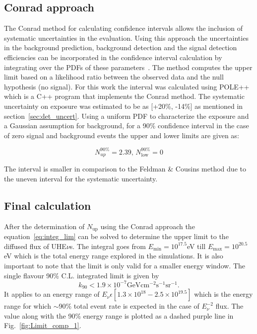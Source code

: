 \subsection{Conrad approach}
\label{subsec:Conrad}
The Conrad method for calculating confidence intervals allows the inclusion of systematic uncertainties in the evaluation. Using this approach the uncertainties in the background prediction, background detection and the signal detection efficiencies can be incorporated in the confidence interval calculation by integrating over the PDFs of these parameters~\cite{Conrad:2002kn}. The method computes the upper limit based on a likelihood ratio between the observed data and the null hypothesis (no signal). For this work the interval was calculated using POLE++~\cite{Conrad:2005zm} which is a C++ program that implements the Conrad method. The systematic uncertainty on exposure was estimated to be as [+20\%, -14\%] as mentioned in section~\ref{sec:det_uncert}. Using a uniform PDF to characterize the exposure and a Gaussian assumption for background, for a 90\% confidence interval in the case of zero signal and background events the upper and lower limits are given as: 

\begin{equation}
  \label{eq:Conrad_lim}
  N^{90\%}_{up} = 2.39, \,N^{90\%}_{\text{low}} = 0
\end{equation}

The interval is smaller in comparison to the Feldman \& Cousins method due to the uneven interval for the systematic uncertainty. 

\subsection{Final calculation}
\label{subsec:final_lim}
After the determination of $N_{\text{up}}$ using the Conrad approach the equation~\ref{eq:integ_lim} can be solved to determine the upper limit to the diffused flux of UHE$\nu$s. The integral goes from $E_{\text{min}} = 10^{17.5} $eV till $E_{\text{max}} = 10^{20.5} $eV which is the total energy range explored in the simulations. It is also important to note that the limit is only valid for a smaller energy window. The single flavour 90\% C.L. integrated limit is given by 
\begin{equation}
  \label{eq:final_lim} 
  k_{90} < 1.9 \times 10^{-7} \mathrm{GeV cm^{-2} s^{-1} sr^{-1}}.
\end{equation}
It applies to an energy range of $E_{\nu} \epsilon [1.3 \times 10^{18} - 2.5 \times 10^{19.5}]$ which is the energy range for which $\sim$90\% total event rate is expected in the case of $E^{-2}_{\nu}$ flux. The value along with the 90\% energy range is plotted as a dashed purple line in Fig.~\ref{fig:Limit_comp_1}.

